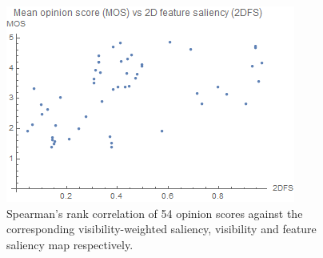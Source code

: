 \begin{figure}
\begin{minipage}{.33\textwidth}
		\includegraphics[width=1\linewidth]{images/mos_vs_2dfs}
	\end{minipage}
	\caption{Spearman's rank correlation of 54 opinion scores against the corresponding visibility-weighted saliency, visibility and feature saliency map respectively.}
	\label{fig:mos_vs_vws}
\end{figure}

